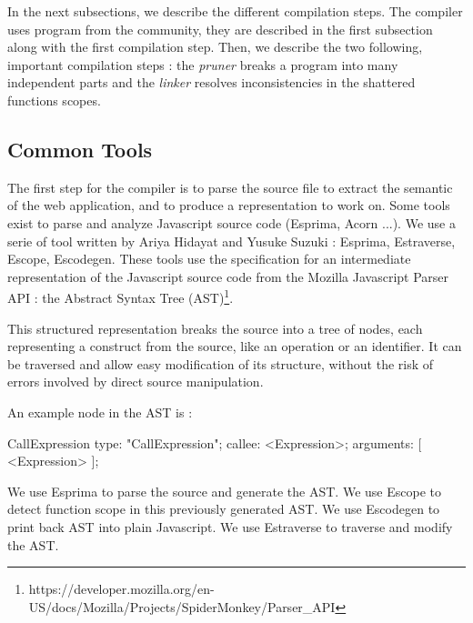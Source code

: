 In the next subsections, we describe the different compilation steps.
The compiler uses program from the community, they are described in the first subsection along with the first compilation step.
Then, we describe the two following, important compilation steps : the \textit{pruner} breaks a program into many independent parts and the \textit{linker} resolves inconsistencies in the shattered functions scopes.


\subsection{Common Tools}

The first step for the compiler is to parse the source file to extract the semantic of the web application, and to produce a representation to work on.
Some tools exist to parse and analyze Javascript source code (Esprima, Acorn ...).
We use a serie of tool written by Ariya Hidayat and Yusuke Suzuki : Esprima, Estraverse, Escope, Escodegen.
These tools use the specification for an intermediate representation of the Javascript source code from the Mozilla Javascript Parser API : the Abstract Syntax Tree (AST)\footnote{\raggedright https://developer.mozilla.org/en-US/docs/Mozilla/Projects/SpiderMonkey/Parser\_API}.

This structured representation breaks the source into a tree of nodes, each representing a construct from the source, like an operation or an identifier.
It can be traversed and allow easy modification of its structure, without the risk of errors involved by direct source manipulation.

An example node in the AST is :

\begin{code}[Javascript, caption={Example of an AST node},label={lst:astnode}]
CallExpression {
    type: "CallExpression";
    callee: <Expression>;
    arguments: [ <Expression> ];
}
\end{code}

We use Esprima to parse the source and generate the AST.
We use Escope to detect function scope in this previously generated AST. 
We use Escodegen to print back AST into plain Javascript.
We use Estraverse to traverse and modify the AST.

